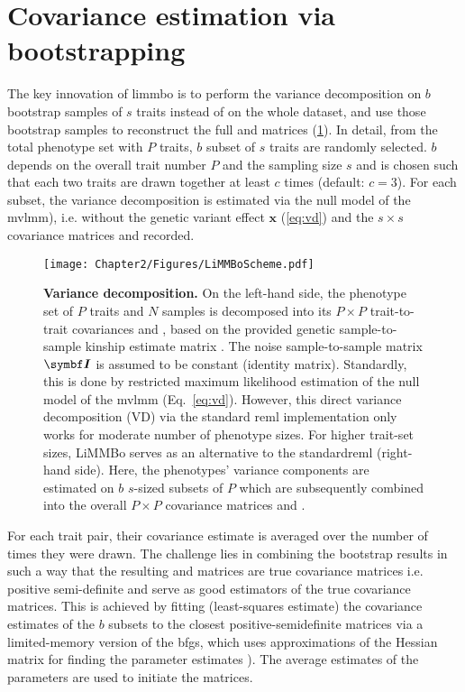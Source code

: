\section{Covariance estimation via bootstrapping}
\label{section:bootstrapping-limmbo}
The key innovation of \gls{limmbo} is to perform the variance decomposition on \(b\) bootstrap samples of \(s\) traits instead of on the whole dataset, and use those bootstrap samples to reconstruct the full  and  matrices (\cref{fig:vd}). In detail, from the total phenotype set with \(P\) traits, \(b\) subset of \(s\) traits are randomly selected.  \(b\) depends on the overall trait number \(P\) and the sampling size \(s\) and is chosen such that each two traits are drawn together at least \(c\) times (default: \(c=3\)). For each subset, the variance decomposition is estimated via the null model of the \gls{mvlmm}), i.e. without the genetic variant effect \(\mathbf{x}\) (\cref{eq:vd}) and the $s \times s$ covariance matrices  and recorded. 
%
\begin{figure}[hbtp]
	\centering
	\texttt{[image: Chapter2/Figures/LiMMBoScheme.pdf]}
	\caption[\textbf{Variance decomposition.}]{\textbf{Variance decomposition.} On the left-hand side, the phenotype set of \(P\) traits and \(N\) samples is decomposed into its \(P \times P\) trait-to-trait covariances  and , based on the provided genetic sample-to-sample kinship estimate matrix . The noise sample-to-sample matrix \(\mat{I}\) is assumed to be constant (identity matrix). Standardly, this is done by restricted maximum likelihood estimation of the null model of the \gls{mvlmm} (Eq.~\ref{eq:vd}). However, this direct variance decomposition (VD) via the standard \gls{reml} implementation only works for moderate number of phenotype sizes. For higher trait-set sizes, LiMMBo serves as an alternative to the standard\gls{reml} (right-hand side). Here, the phenotypes' variance components are estimated on \(b\) \(s\)-sized subsets of \(P\) which are subsequently combined into the overall \(P \times P\) covariance matrices  and .} 
	 	\label{fig:vd}
\end{figure}
%
For each trait pair, their covariance estimate is averaged over the number of times they were drawn. The challenge lies in combining the bootstrap results in such a way that the resulting  and  matrices are true covariance matrices i.e. positive semi-definite and serve as good estimators of the true covariance matrices. This is achieved by fitting (least-squares estimate) the covariance estimates of the \(b\) subsets to the closest positive-semidefinite matrices via a limited-memory version of the \gls{bfgs}, which uses approximations of the Hessian matrix for finding the parameter estimates \citep{Byrd1995}). The average estimates of the parameters are used to initiate the matrices. 


